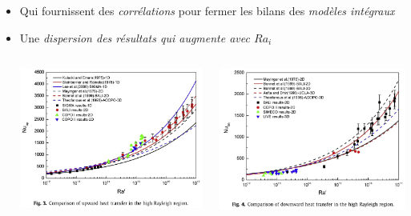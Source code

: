 \begin{frame}[fragile]
\begin{itemize}
\item Qui fournissent des \emph{corrélations} pour fermer les bilans des \emph{modèles intégraux}
\item Une \emph{dispersion des résultats qui augmente avec $Ra_i$} \danger
\begin{columns}[T]
    \begin{column}{0.4\textwidth}
\centering \includegraphics[width=1.0\textwidth]{Figures/Fig3_Zhang2015.png}
    \end{column}
    \begin{column}{0.4\textwidth}
\centering \includegraphics[width=1.0\textwidth]{Figures/Fig4_Zhang2015.png}

\end{column}
\end{columns}
\end{itemize}
\end{frame}

